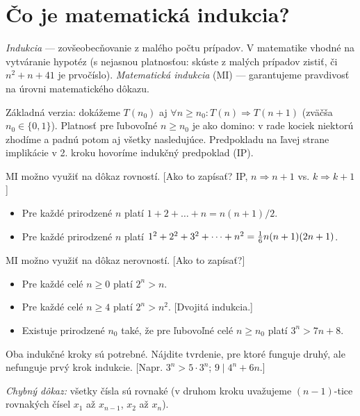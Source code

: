 \documentclass[a4paper, 11pt]{article}
\begin{document}




\section{Čo je matematická indukcia?}

\emph{Indukcia} --- zovšeobecňovanie z malého počtu prípadov. V matematike vhodné na vytváranie hypotéz (s nejasnou platnosťou: skúste z malých prípadov zistiť, či $n^2 + n + 41$ je prvočíslo). \emph{Matematická indukcia} (MI) --- garantujeme pravdivosť na úrovni matematického dôkazu.

Základná verzia: dokážeme $T(n_0)$ aj $\forall n\ge n_0: T(n)\Rightarrow T(n+1)$ (zväčša $n_0\in \{0, 1\}$).
Platnosť pre ľubovoľné $n\ge n_0$ je ako domino: v rade kociek niektorú zhodíme a padnú potom aj všetky nasledujúce.
Predpokladu na ľavej strane implikácie v 2. kroku hovoríme indukčný predpoklad (IP).

MI možno využiť na dôkaz rovností. [Ako to zapísať? IP, $n\Rightarrow n+1$ vs. $k\Rightarrow k+1$]
\begin{itemize}
\item Pre každé prirodzené $n$ platí $1+2+\dots+n = n(n+1)/2$.
\item Pre každé prirodzené $n$ platí $1^2+2^2+3^2+\cdots+n^2={1\over 6}n(n+1)(2n+1)$.
\end{itemize}

MI možno využiť na dôkaz nerovností. [Ako to zapísať?]
\begin{itemize}
\item Pre každé celé $n\ge 0$ platí $2^n > n$.
\item Pre každé celé $n\ge 4$ platí $2^n > n^2$. [Dvojitá indukcia.]
\item Existuje prirodzené $n_0$ také, že pre ľubovoľné celé $n\ge n_0$ platí $3^n > 7n+8$.
\end{itemize}

Oba indukčné kroky sú potrebné. Nájdite tvrdenie, pre ktoré funguje druhý, ale nefunguje prvý krok indukcie.
[Napr. $3^n>5\cdot 3^n$; $9\mid 4^n+6n$.]

\emph{Chybný dôkaz:} všetky čísla sú rovnaké (v druhom kroku uvažujeme $(n-1)$-tice rovnakých čísel $x_1$ až $x_{n-1}$, $x_2$ až $x_n$).
\end{document}
